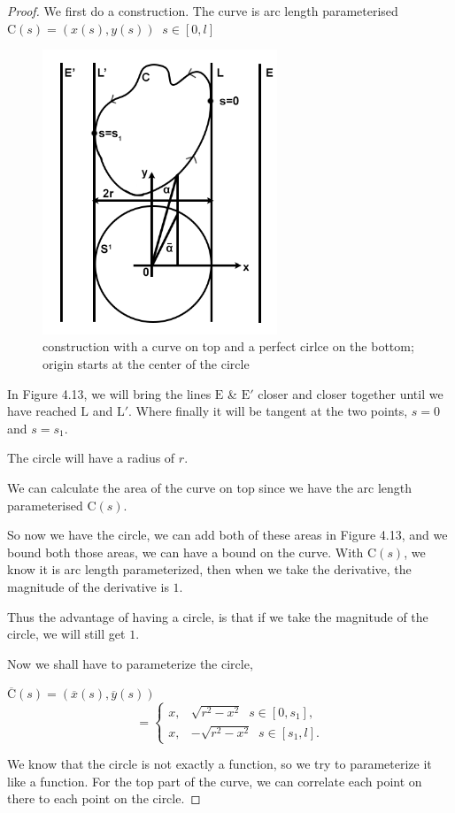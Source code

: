 \documentclass[a4paper]{book}
\numberwithin{theorem}{section}%
\begin{document}
\begin{proof}
    We first do a construction. The curve is arc length parameterised $\displaystyle \mathrm{C}(s)=(x(s),y(s))\;\;s\in[0,l]$
    \begin{figure}[hbt!]
        \begin{center}   
            \includegraphics[width=70mm]{esfigure}
            \caption{construction with a curve on top and a perfect cirlce on the bottom; origin starts at the center of the circle}
        \end{center}
    \end{figure}\leavevmode
    \newline
    In Figure 4.13, we will bring the lines $\mathrm{E}$ \& $\mathrm{E}'$ closer and closer together until we have reached $\mathrm{L}$ and $\mathrm{L}'$. Where finally it will be tangent at the two points, $s=0$ and $s=s_{1}$. 

    The circle will have a radius of $r$. 

    We can calculate the area of the curve on top since we have the arc length parameterised $\mathrm{C}(s)$.

    So now we have the circle, we can add both of these areas in Figure 4.13, and we bound both those areas, we can have a bound on the curve. With $\mathrm{C}(s)$, we know it is arc length parameterized, then when we take the derivative, the magnitude of the derivative is $1$. 

    Thus the advantage of having a circle, is that if we take the magnitude of the circle, we will still get $1$.

    Now we shall have to parameterize the circle,
    \begin{center}
        $\displaystyle \overline{\mathrm{C}}(s)=(\overline{x}(s),\overline{y}(s))$
        \begin{equation*}
            =\begin{cases}
                x, & \sqrt{r^{2}-x^{2}}\;\;s\in[0,s_{1}],\\
                x, & -\sqrt{r^{2}-x^{2}}\;\;s\in[s_{1},l].
            \end{cases}
        \end{equation*}
    \end{center}
    We know that the circle is not exactly a function, so we try to parameterize it like a function. For the top part of the curve, we can correlate each point on there to each point on the circle.


\end{proof}
\end{document}
